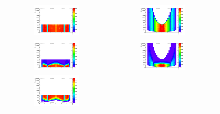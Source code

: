 \begin{figure}[bh]
  \begin{center}
    \begin{tabular}{cc}
      \includegraphics[width=0.45\textwidth]{chapters/Zprime/Saturation/images/FlatPt/Sample_variables/Ptmc_eta.png} &
      \includegraphics[width=0.45\textwidth]{chapters/Zprime/Saturation/images/FlatPt/Sample_variables/Emc_eta.png} \\
      \includegraphics[width=0.45\textwidth]{chapters/Zprime/Saturation/images/FlatPt/Sample_variables/Ptmc_eta_nos.png} &
      \includegraphics[width=0.45\textwidth]{chapters/Zprime/Saturation/images/FlatPt/Sample_variables/Emc_eta_nos.png} \\
      \includegraphics[width=0.45\textwidth]{chapters/Zprime/Saturation/images/FlatPt/Sample_variables/Ptmc_eta_s.png} &

\end{tabular}
\end{center}
\end{figure}
